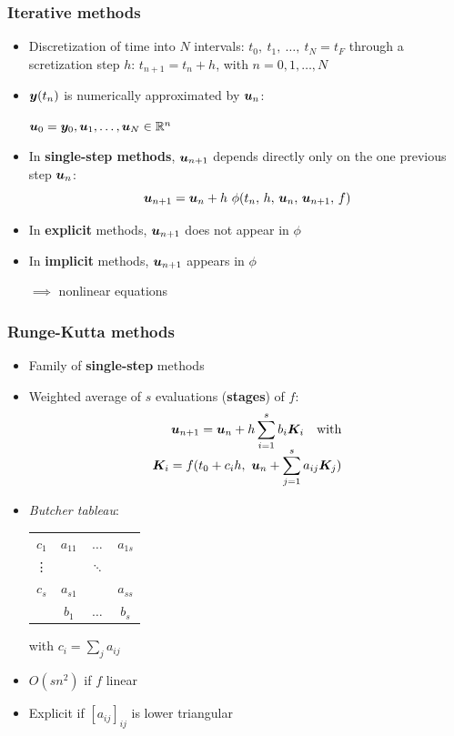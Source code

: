 \documentclass{beamer}
\begin{document}
\begin{frame} %
	\frametitle{Iterative methods} %
	\begin{itemize}
		\item Discretization of time into $N$ intervals: $t_0, \ t_1, \ \dots, \ t_{N} = t_F$ through a scretization step $h$: $t_{n+1} = t_n + h$, with $n = 0, 1, \dots, N$
		\item $\boldsymbol y(t_n)$ is numerically approximated by $\boldsymbol u_n$:
		\begin{center}
			$\boldsymbol u_0 = \boldsymbol y_0, \boldsymbol u_1, \dots, \boldsymbol u_{N} \in \mathbb R^n$
		\end{center}
		\pause
		\item In \textbf{single-step methods}, $\boldsymbol u_{n+1}$ depends directly only on the one previous step $\boldsymbol u_{n}$:
		$$ \boldsymbol u_{n+1} = \boldsymbol u_{n} + h \ \phi(t_n, \, h, \, \boldsymbol u_n, \, \boldsymbol u_{n+1}, \, f) $$
		\item In \textbf{explicit} methods, $\boldsymbol u_{n+1}$ does not appear in $\phi$
		\item In \textbf{implicit} methods, $\boldsymbol u_{n+1}$ appears in $\phi$
		\begin{center}
			\vspace{-5pt}
			$\implies$ nonlinear equations
		\end{center}
	\end{itemize}
\end{frame}


\begin{frame} %
	\frametitle{Runge-Kutta methods}
	\begin{itemize}
		\item Family of \textbf{single-step} methods
		\item Weighted average of $s$ evaluations (\textbf{stages}) of $f$: \\[-20pt]
		\begin{align*}
			\boldsymbol u_{n+1} = \boldsymbol u_{n} + h \sum_{i=1}^s b_i \boldsymbol K_i \quad \text{with} \\[-5pt]
			\boldsymbol K_i = f(t_0 + c_i h, \ \boldsymbol u_n + \sum_{j=1}^s a_{ij} \boldsymbol K_j)
		\end{align*}
		\pause
		\vspace{-22pt}
		\item \textit{Butcher tableau}:
		\begin{center}
			\begin{tabular}{c|ccc}
				$c_1$ & $a_{11}$ & $\dots$ & $a_{1s}$ \\
				\vdots & & $\ddots$ & \\
				$c_s$ & $a_{s1}$ & & $a_{ss}$ \\
				\hline
				& $b_1$ & $\dots$ & $b_s$
			\end{tabular}
		\hspace{30pt} with $c_i = \sum_j a_{ij}$
		\pause
		\end{center}
		\item $O(s n^2)$ if $f$ linear
		\item Explicit if $[a_{ij}]_{ij}$ is lower triangular
	\end{itemize}
\end{frame}
\end{document}
